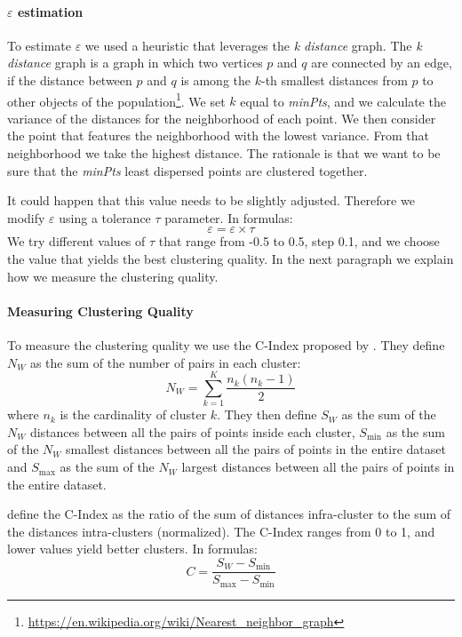\paragraph{$\varepsilon$ estimation} %
\label{par:paragraph_name}
To estimate $\varepsilon$ we used a heuristic that leverages the \emph{k distance} graph.
The \emph{k distance} graph is a graph in which two vertices $p$ and $q$ are connected by an
edge, if the distance between $p$ and $q$ is among the $k$-th smallest distances from
$p$ to other objects of the population\footnote{\url{https://en.wikipedia.org/wiki/Nearest_neighbor_graph}}. We set $k$ equal to \emph{minPts}, and we calculate the
variance of the distances for the neighborhood of each point. We then consider the point that
features the neighborhood with the lowest variance. From that neighborhood we take the
highest distance. The rationale is that we want to be sure that the \emph{minPts} least
dispersed points are clustered together.

It could happen that this value needs to be slightly adjusted. Therefore we modify $\varepsilon$
using a tolerance $\tau$ parameter. In formulas:
\[ \varepsilon = \varepsilon \times \tau \]
We try different values of $\tau$ that range from -0.5 to 0.5, step 0.1, and we choose the value
that yields the best clustering quality. In the next paragraph we explain how we measure
the clustering quality.


\paragraph{Measuring Clustering Quality} %
\label{par:measuring_clustering_quality}
To measure the clustering quality we use the C-Index proposed by \citet{hubert1976}.
They define $N_W$ as the sum of the number of pairs in each cluster:
\[ N_W = \sum^K_{k=1} \frac{n_k(n_k-1)}{2} \]
where $n_k$ is the cardinality of cluster $k$.
They then define $S_W$ as the sum of the $N_W$ distances between all the pairs of points
inside each cluster, $S_{\mathrm{min}}$ as the sum of the $N_W$ smallest distances between all
the pairs of points in the entire dataset and $S_{\mathrm{max}}$ as the sum of the $N_W$ largest
distances between all the pairs of points in the entire dataset.

\citet{hubert1976} define the C-Index as the ratio of the sum of distances infra-cluster to the sum
of the distances intra-clusters (normalized). The C-Index ranges from 0 to 1, and lower
values yield better clusters.
In formulas:
\[ C = \frac{S_W - S_{\mathrm{min}}} {S_{\mathrm{max}} - S_{\mathrm{min}}} \]

